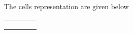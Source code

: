 \documentclass[a4]{article}
\begin{document}
	\vspace*{0.2cm}
	The cells representation are given below
	
	\begin{center}
		\begin{tabular}{|l|l|l|l|}
			\hline
			\cellcolor{black!40}\hspace*{0.9cm}& \hspace*{0.9cm}&\hspace*{0.9cm}&\cellcolor{black!40}\hspace*{0.9cm}\\
			\hline&\cellcolor{black!40}&\cellcolor{black!40}&\\
			\hline\cellcolor{black!40}& &\cellcolor{black!40}&\cellcolor{black!40}\\
			\hline& & &\cellcolor{black!40}\\
			\hline
		\end{tabular}
	\end{center}
	\vspace*{0.2cm}
	
\end{document}
